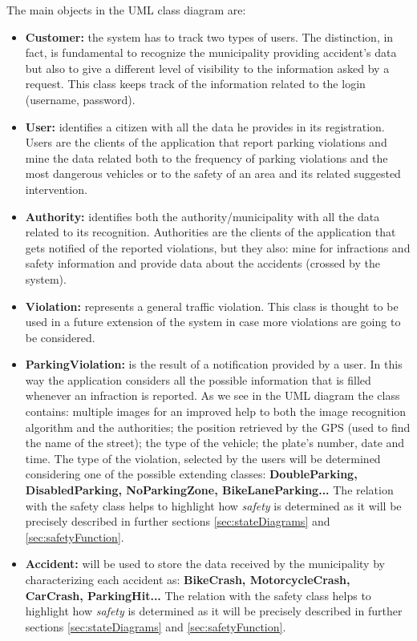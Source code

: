 	The main objects in the UML class diagram are:
	\begin{itemize}
		\item \textbf{Customer:} the system has to track two types of users. The distinction, in fact, is fundamental to recognize the municipality providing accident's data but also to give a different level of visibility to the information asked by a request. This class keeps track of the information related to the login (username, password).
		
		\item \textbf{User:} identifies a citizen with all the data he provides in its registration. Users are the clients of the application that report parking violations and mine the data related both to the frequency of parking violations and the most dangerous vehicles or to the safety of an area and its related suggested intervention.
		
		\item \textbf{Authority:} identifies both the authority/municipality with all the data related to its recognition. Authorities are the clients of the application that gets notified of the reported violations, but they also: mine for infractions and safety information and provide data about the accidents (crossed by the system).
		
		\item \textbf{Violation:} represents a general traffic violation. This class is thought to be used in a future extension of the system in case more violations are going to be considered.
		
		\item \textbf{ParkingViolation:} is the result of a notification provided by a user. In this way the application considers all the possible information that is filled whenever an infraction is reported. As we see in the UML diagram the class contains: multiple images for an improved help to both the image recognition algorithm and the authorities; the position retrieved by the GPS (used to find the name of the street); the type of the vehicle; the plate's number, date and time. The type of the violation, selected by the users will be determined considering one of the possible extending classes: \textbf{DoubleParking, DisabledParking, NoParkingZone, BikeLaneParking...} The relation with the safety class helps to highlight how \emph{safety} is determined as it will be precisely described in further sections \ref{sec:stateDiagrams} and \ref{sec:safetyFunction}.
		
		\item \textbf{Accident:} will be used to store the data received by the municipality by characterizing each accident as: \textbf{BikeCrash, MotorcycleCrash, CarCrash, ParkingHit...} The relation with the safety class helps to highlight how \emph{safety} is determined as it will be precisely described in further sections \ref{sec:stateDiagrams} and \ref{sec:safetyFunction}.
		

\end{itemize}
